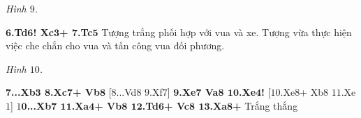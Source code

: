 \begin{multicols}{2}
\begin{center}
		\scalebox{0.85}\showboard
		\vskip 0.1cm
		\textit{\small\color{gocco}Hình $9$.}
	\end{center}
	\textbf{\color{gocco}$\pmb{6}$.Td$\pmb{6}$! Xc$\pmb{3}$+ $\pmb{7}$.Tc$\pmb{5}$}  
	\vskip 0.1cm
	Tượng trắng phối hợp với vua và xe. Tượng vừa thực hiện việc che chắn cho vua và tấn công vua đối phương.
	\begin{center}
		\newgame
		\scalebox{0.85}\showboard
		\vskip 0.1cm
		\textit{\small\color{gocco}Hình $10$.}
	\end{center}
	\textbf{\color{gocco}$\pmb{7}$...Xb$\pmb{3}$ $\pmb{8}$.Xc$\pmb{7}$+ Vb$\pmb{8}$} [$8$...Vd$8$ $9$.Xf$7$]
	\vskip 0.1cm
	\textbf{\color{gocco}$\pmb{9}$.Xe$\pmb{7}$ Va$\pmb{8}$ $\pmb{10}$.Xe$\pmb{4}$!} [$10$.Xe$8$+ Xb$8$ $11$.Xe$1$]
	\vskip 0.1cm
	\textbf{\color{gocco}$1\pmb{0}$...Xb$\pmb{7}$ $\pmb{11}$.Xa$\pmb{4}$+ Vb$\pmb{8}$ $\pmb{12}$.Td$\pmb{6}$+ Vc$\pmb{8}$ $\pmb{13}$.Xa$\pmb{8}$+} Trắng thắng
\end{multicols}